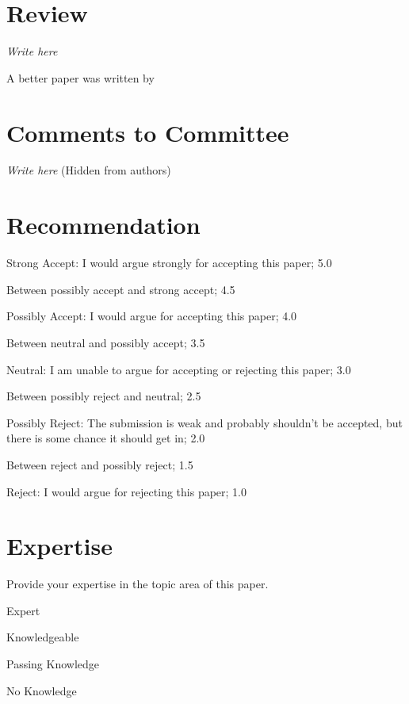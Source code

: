 \documentclass[12pt]{article}
\newcommand{\cmark}{\ding{51}}%
\newcommand{\done}{\rlap{$\square$}{\raisebox{2pt}{\large\hspace{1pt}\cmark}}%
\hspace{-2.5pt}}
\begin{document}
\maketitle

\section{Review}
\emph{Write here}

A better paper was written by ~\cite{Hoang:2017:ASP:3025453.3025860}


\section{Comments to Committee }
\emph{Write here} (Hidden from authors)


\section{Recommendation}
\begin{todolist}
\item[\done] Strong Accept: I would argue strongly for accepting this paper; 5.0
\item Between possibly accept and strong accept; 4.5
\item  Possibly Accept: I would argue for accepting this paper; 4.0
\item Between neutral and possibly accept; 3.5
\item Neutral: I am unable to argue for accepting or rejecting this paper; 3.0
\item Between possibly reject and neutral; 2.5
\item Possibly Reject: The submission is weak and probably shouldn't be accepted, but there is some chance it should get in; 2.0
\item Between reject and possibly reject; 1.5
\item  Reject: I would argue for rejecting this paper; 1.0
\end{todolist}


\section{Expertise}
Provide your expertise in the topic area of this paper.
\begin{todolist}
\item[\done] Expert
\item Knowledgeable
\item Passing Knowledge
\item No Knowledge
\end{todolist}




\end{document}
